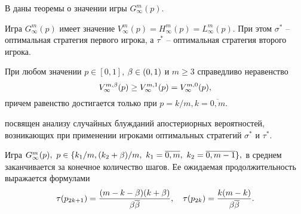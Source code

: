 В  даны теоремы о значении игры $G^m_\infty(p)$.
\begin{theorem}
  Игра $G^m_\infty(p)$ имеет значение $V^m_\infty(p) = H^m_\infty(p) = L^m_\infty(p)$.
  При этом $\sigma^*$ -- оптимальная стратегия первого игрока\textup{,} а $\tau^*$ -- оптимальная стратегия второго игрока.
\end{theorem}

\begin{theorem}
  При любом значении $p \in [0,1]$, $\beta \in (0,1)$ и $m \geq 3$ справедливо неравенство
  \begin{equation*}
    V^{m, \beta}_\infty(p) \geq V^{m,1}_\infty(p) = V^{m,0}_\infty(p),
  \end{equation*}
  причем равенство достигается только при $p = k/m, k = \overline{0,m}$.
\end{theorem}

 посвящен анализу случайных блужданий апостериорных вероятностей, возникающих при применении игроками оптимальных стратегий $\sigma^*$ и $\tau^*$.

\begin{theorem}
  Игра $G^m_\infty(p),\ p \in \{k_1/m, (k_2+\beta)/m,\ k_1 = \overline{0,m},\ k_2 = \overline{0,m-1}\},$ в среднем заканчивается за конечное количество шагов.
  Ее ожидаемая продолжительность выражается формулами
  \begin{equation*} 
    \tau(p_{2k+1}) = \frac{(m-k-\beta)(k+\beta)}{\beta {\overline{\beta}}},\quad
    \tau(p_{2k}) = \frac{k(m-k)}{\beta {\overline{\beta}}}.
  \end{equation*}
\end{theorem}




